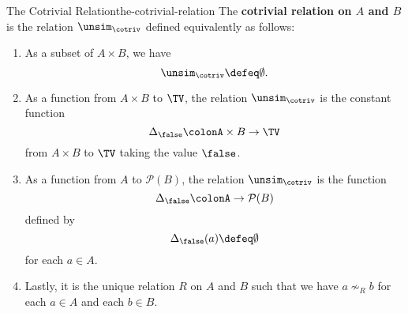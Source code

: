 \begin{example}{The Cotrivial Relation}{the-cotrivial-relation}%
    The \textbf{cotrivial relation on $A$ and $B$} is the relation $\unsim_{\cotriv}$ defined equivalently as follows:%
    \begin{enumerate}
        \item\label{the-cotrivial-relation-1}As a subset of $A\times B$, we have
            \[
                \unsim_{\cotriv}%
                \defeq%
                \emptyset.%
            \]%
        \item\label{the-cotrivial-relation-2}As a function from $A\times B$ to $\TV$, the relation $\unsim_{\cotriv}$ is the constant function
            \[%
                \Delta_{\false}%
                \colon%
                A\times B%
                \to%
                \TV%
            \]%
            from $A\times B$ to $\TV$ taking the value $\false$.
        \item\label{the-cotrivial-relation-3}As a function from $A$ to $\mathcal{P}(B)$, the relation $\unsim_{\cotriv}$ is the function
            \[%
                \Delta_{\false}%
                \colon%
                A%
                \to%
                \mathcal{P}(B)%
            \]%
            defined by
            \[
                \Delta_{\false}(a)%
                \defeq%
                \emptyset%
            \]%
            for each $a\in A$.
        \item\label{the-cotrivial-relation-4}Lastly, it is the unique relation $R$ on $A$ and $B$ such that we have $a\nsim_{R}b$ for each $a\in A$ and each $b\in B$.
    \end{enumerate}
\end{example}
